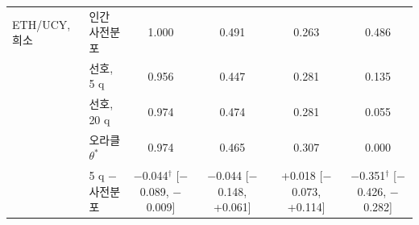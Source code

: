 \begin{table}[t]
{\begin{tabular}{llcccc}
\midrule
ETH/UCY, 희소 & 인간 사전분포 & 1.000 & 0.491 & 0.263 & 0.486 \\
 & 선호, 5 q & 0.956 & 0.447 & 0.281 & 0.135 \\
 & 선호, 20 q & 0.974 & 0.474 & 0.281 & 0.055 \\
 & 오라클 $\theta^*$ & 0.974 & 0.465 & 0.307 & 0.000 \\
 & 5 q $-$ 사전분포 & $-$0.044$^\dagger$ \scriptsize{[$-$0.089, $-$0.009]} & $-$0.044 \scriptsize{[$-$0.148, +0.061]} & +0.018 \scriptsize{[$-$0.073, +0.114]} & $-$0.351$^\dagger$ \scriptsize{[$-$0.426, $-$0.282]} \\
\bottomrule
\end{tabular}}
\end{table}
